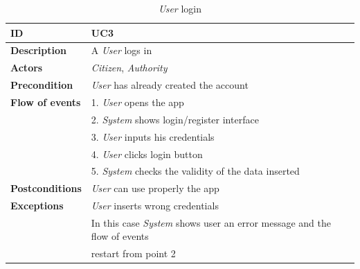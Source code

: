 \documentclass{article}
\begin{document}
\clearpage
\begin{table}
    \begin{center}
    \centering
\begin{tabular}{ | l | l |}
\hline
\textbf{ID} & UC3 \\
\hline
\textbf{Description} & A \textit{User} logs in  \\
\hline
\textbf{Actors} & \textit{Citizen}, \textit{Authority}\\
\hline
\textbf{Precondition} & \textit{User} has already created the account \\
\hline
\textbf{Flow of events} & 1. \textit{User} opens the app \\
                        & 2. \textit{System} shows login/register interface \\
                        & 3. \textit{User} inputs his credentials \\
                        & 4. \textit{User} clicks login button  \\
                        & 5. \textit{System} checks the validity of the data inserted \\
\hline
\textbf{Postconditions} & \textit{User} can use properly the app   \\
\hline
\textbf{Exceptions} & \textit{User} inserts wrong credentials \\
                    & In this case \textit{System} shows user an error message and the flow of events  \\
                    & restart from point 2\\  
\hline
\end{tabular}
\caption{\textit{User} login}
\end{center}
\end{table}

\clearpage
\end{document}
